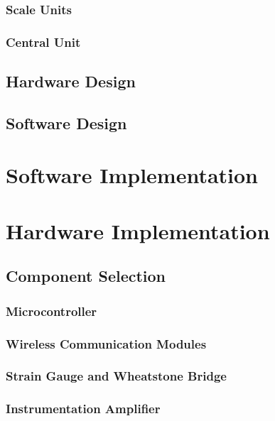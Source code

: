 \documentclass{l3proj}
\begin{document}
\subsection{Scale Units}
\label{scale}

\subsection{Central Unit}
\label{central}


\section{Hardware Design}


\section{Software Design}

\chapter{Software Implementation}
\label{impl}

\chapter{Hardware Implementation}

\section{Component Selection}
\subsection{Microcontroller}

\subsection{Wireless Communication Modules}

\subsection{Strain Gauge and Wheatstone Bridge}


\subsection{Instrumentation Amplifier}
\label{ina}

\end{document}

